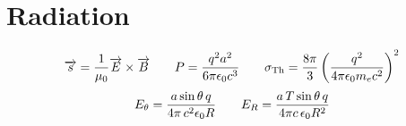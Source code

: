 \documentclass{article}
\begin{document}
\section*{Radiation}
\[\overrightarrow{s}=\frac{1}{\mu_0}\overrightarrow{E}\times\overrightarrow{B}\hspace{7 mm}P=\frac{q^2a^2}{6\pi\epsilon_0c^3}\hspace{7 mm}\sigma_{\textnormal{Th}}=\frac{8\pi}{3}\left(\frac{q^2}{4\pi\epsilon_0m_ec^2}\right)^2\]
\[E_\theta=\frac{a\sin\theta\,q}{4\pi\,c^2\epsilon_0R}\hspace{7 mm}E_R=\frac{a\,T\sin\theta\,q}{4\pi c\,\epsilon_0R^2}\]
\[\]
\end{document}
